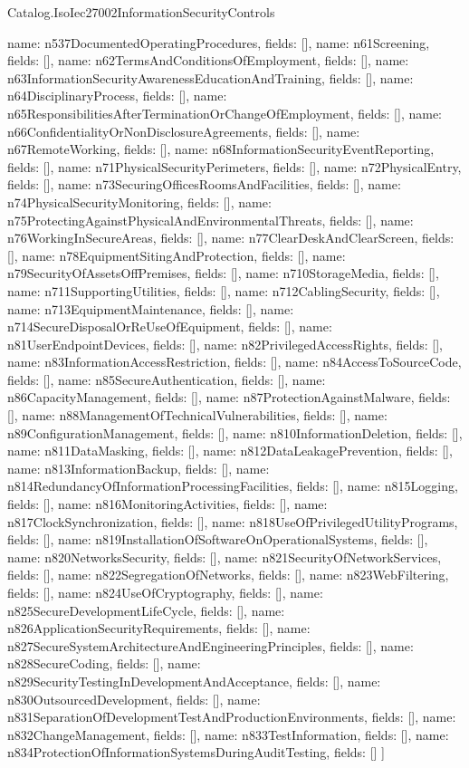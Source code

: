 \begin{lexlean}{Catalog.IsoIec27002InformationSecurityControls}
\begin{semanticmodule}
{    {name: n537DocumentedOperatingProcedures, fields: []},
    {name: n61Screening, fields: []},
    {name: n62TermsAndConditionsOfEmployment, fields: []},
    {name: n63InformationSecurityAwarenessEducationAndTraining, fields: []},
    {name: n64DisciplinaryProcess, fields: []},
    {name: n65ResponsibilitiesAfterTerminationOrChangeOfEmployment, fields: []},
    {name: n66ConfidentialityOrNonDisclosureAgreements, fields: []},
    {name: n67RemoteWorking, fields: []},
    {name: n68InformationSecurityEventReporting, fields: []},
    {name: n71PhysicalSecurityPerimeters, fields: []},
    {name: n72PhysicalEntry, fields: []},
    {name: n73SecuringOfficesRoomsAndFacilities, fields: []},
    {name: n74PhysicalSecurityMonitoring, fields: []},
    {name: n75ProtectingAgainstPhysicalAndEnvironmentalThreats, fields: []},
    {name: n76WorkingInSecureAreas, fields: []},
    {name: n77ClearDeskAndClearScreen, fields: []},
    {name: n78EquipmentSitingAndProtection, fields: []},
    {name: n79SecurityOfAssetsOffPremises, fields: []},
    {name: n710StorageMedia, fields: []},
    {name: n711SupportingUtilities, fields: []},
    {name: n712CablingSecurity, fields: []},
    {name: n713EquipmentMaintenance, fields: []},
    {name: n714SecureDisposalOrReUseOfEquipment, fields: []},
    {name: n81UserEndpointDevices, fields: []},
    {name: n82PrivilegedAccessRights, fields: []},
    {name: n83InformationAccessRestriction, fields: []},
    {name: n84AccessToSourceCode, fields: []},
    {name: n85SecureAuthentication, fields: []},
    {name: n86CapacityManagement, fields: []},
    {name: n87ProtectionAgainstMalware, fields: []},
    {name: n88ManagementOfTechnicalVulnerabilities, fields: []},
    {name: n89ConfigurationManagement, fields: []},
    {name: n810InformationDeletion, fields: []},
    {name: n811DataMasking, fields: []},
    {name: n812DataLeakagePrevention, fields: []},
    {name: n813InformationBackup, fields: []},
    {name: n814RedundancyOfInformationProcessingFacilities, fields: []},
    {name: n815Logging, fields: []},
    {name: n816MonitoringActivities, fields: []},
    {name: n817ClockSynchronization, fields: []},
    {name: n818UseOfPrivilegedUtilityPrograms, fields: []},
    {name: n819InstallationOfSoftwareOnOperationalSystems, fields: []},
    {name: n820NetworksSecurity, fields: []},
    {name: n821SecurityOfNetworkServices, fields: []},
    {name: n822SegregationOfNetworks, fields: []},
    {name: n823WebFiltering, fields: []},
    {name: n824UseOfCryptography, fields: []},
    {name: n825SecureDevelopmentLifeCycle, fields: []},
    {name: n826ApplicationSecurityRequirements, fields: []},
    {name: n827SecureSystemArchitectureAndEngineeringPrinciples, fields: []},
    {name: n828SecureCoding, fields: []},
    {name: n829SecurityTestingInDevelopmentAndAcceptance, fields: []},
    {name: n830OutsourcedDevelopment, fields: []},
    {name: n831SeparationOfDevelopmentTestAndProductionEnvironments, fields: []},
    {name: n832ChangeManagement, fields: []},
    {name: n833TestInformation, fields: []},
    {name: n834ProtectionOfInformationSystemsDuringAuditTesting, fields: []}
  ]
}


\end{semanticmodule}
\end{lexlean}
